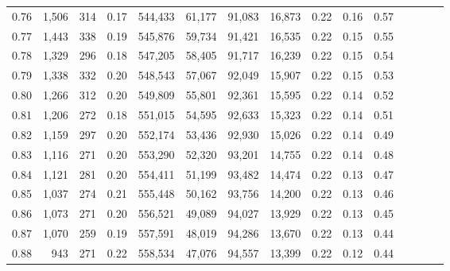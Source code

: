 \begin{tabular}{rrrcrrrrrrrrrrr}
0.76 &   1,506 &     314 &                                       0.17 &  544,433 &   61,177 &   91,083 &  16,873 &  0.22 &  0.16 &                         0.57 \\
0.77 &   1,443 &     338 &                                       0.19 &  545,876 &   59,734 &   91,421 &  16,535 &  0.22 &  0.15 &                         0.55 \\
0.78 &   1,329 &     296 &                                       0.18 &  547,205 &   58,405 &   91,717 &  16,239 &  0.22 &  0.15 &                         0.54 \\
0.79 &   1,338 &     332 &                                       0.20 &  548,543 &   57,067 &   92,049 &  15,907 &  0.22 &  0.15 &                         0.53 \\
0.80 &   1,266 &     312 &                                       0.20 &  549,809 &   55,801 &   92,361 &  15,595 &  0.22 &  0.14 &                         0.52 \\
0.81 &   1,206 &     272 &                                       0.18 &  551,015 &   54,595 &   92,633 &  15,323 &  0.22 &  0.14 &                         0.51 \\
0.82 &   1,159 &     297 &                                       0.20 &  552,174 &   53,436 &   92,930 &  15,026 &  0.22 &  0.14 &                         0.49 \\
0.83 &   1,116 &     271 &                                       0.20 &  553,290 &   52,320 &   93,201 &  14,755 &  0.22 &  0.14 &                         0.48 \\
0.84 &   1,121 &     281 &                                       0.20 &  554,411 &   51,199 &   93,482 &  14,474 &  0.22 &  0.13 &                         0.47 \\
0.85 &   1,037 &     274 &                                       0.21 &  555,448 &   50,162 &   93,756 &  14,200 &  0.22 &  0.13 &                         0.46 \\
0.86 &   1,073 &     271 &                                       0.20 &  556,521 &   49,089 &   94,027 &  13,929 &  0.22 &  0.13 &                         0.45 \\
0.87 &   1,070 &     259 &                                       0.19 &  557,591 &   48,019 &   94,286 &  13,670 &  0.22 &  0.13 &                         0.44 \\
0.88 &     943 &     271 &                                       0.22 &  558,534 &   47,076 &   94,557 &  13,399 &  0.22 &  0.12 &                         0.44 \\

\end{tabular}
